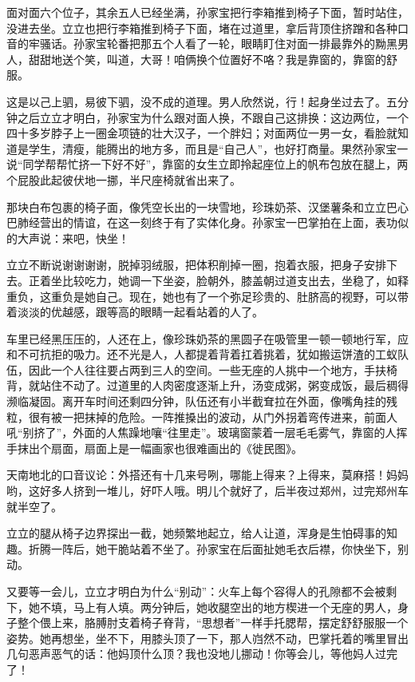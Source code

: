 \documentclass[lang=cn,newtx,12pt,scheme=chinese]{elegantbook}
\begin{document}
面对面六个位子，其余五人已经坐满，孙家宝把行李箱推到椅子下面，暂时站住，没进去坐。立立也把行李箱推到椅子下面，堵在过道里，拿后背顶住挤蹭和各种口音的牢骚话。孙家宝轮番把那五个人看了一轮，眼睛盯住对面一排最靠外的黝黑男人，甜甜地送个笑，叫道，大哥！咱俩换个位置好不咯？我是靠窗的，靠窗的舒服。

这是以己上驷，易彼下驷，没不成的道理。男人欣然说，行！起身坐过去了。五分钟之后立立才明白，孙家宝为什么跟对面人换，不跟自己这排换：这边两位，一个四十多岁脖子上一圈金项链的壮大汉子，一个胖妇；对面两位一男一女，看脸就知道是学生，清瘦，能腾出的地方多，而且是“自己人”，也好打商量。果然孙家宝一说“同学帮帮忙挤一下好不好”，靠窗的女生立即拎起座位上的帆布包放在腿上，两个屁股此起彼伏地一挪，半尺座椅就省出来了。

那块白布包裹的椅子面，像凭空长出的一块雪地，珍珠奶茶、汉堡薯条和立立巴心巴肺经营出的情谊，在这一刻终于有了实体化身。孙家宝一巴掌拍在上面，表功似的大声说：来吧，快坐！

立立不断说谢谢谢谢，脱掉羽绒服，把体积削掉一圈，抱着衣服，把身子安排下去。正着坐比较吃力，她调一下坐姿，脸朝外，膝盖朝过道支出去，坐稳了，如释重负，这重负是她自己。现在，她也有了一个弥足珍贵的、肚脐高的视野，可以带着淡淡的优越感，跟等高的眼睛一起看站着的人了。

车里已经黑压压的，人还在上，像珍珠奶茶的黑圆子在吸管里一顿一顿地行军，应和不可抗拒的吸力。还不光是人，人都提着背着扛着挑着，犹如搬运饼渣的工蚁队伍，因此一个人往往要占两到三人的空间。一些无座的人挑中一个地方，手扶椅背，就站住不动了。过道里的人肉密度逐渐上升，汤变成粥，粥变成饭，最后稠得濒临凝固。离开车时间还剩四分钟，队伍还有小半截耷拉在外面，像嘴角挂的残粒，很有被一把抹掉的危险。一阵推搡出的波动，从门外拐着弯传进来，前面人吼“别挤了”，外面的人焦躁地嚷“往里走”。玻璃窗蒙着一层毛毛雾气，靠窗的人挥手抹出个扇面，扇面上是一幅画家也很难画出的《徙民图》。

天南地北的口音议论：外搭还有十几来号咧，哪能上得来？上得来，莫麻搭！妈妈哟，这好多人挤到一堆儿，好吓人哦。明儿个就好了，后半夜过郑州，过完郑州车就半空了。

立立的腿从椅子边界探出一截，她频繁地起立，给人让道，浑身是生怕碍事的知趣。折腾一阵后，她干脆站着不坐了。孙家宝在后面扯她毛衣后襟，你快坐下，别动。

又要等一会儿，立立才明白为什么“别动”：火车上每个容得人的孔隙都不会被剩下，她不填，马上有人填。两分钟后，她收腿空出的地方楔进一个无座的男人，身子整个偎上来，胳膊肘支着椅子脊背，“思想者”一样手托腮帮，摆定舒舒服服一个姿势。她再想坐，坐不下，用膝头顶了一下，那人岿然不动，巴掌托着的嘴里冒出几句恶声恶气的话：他妈顶什么顶？我也没地儿挪动！你等会儿，等他妈人过完了！
\end{document}
